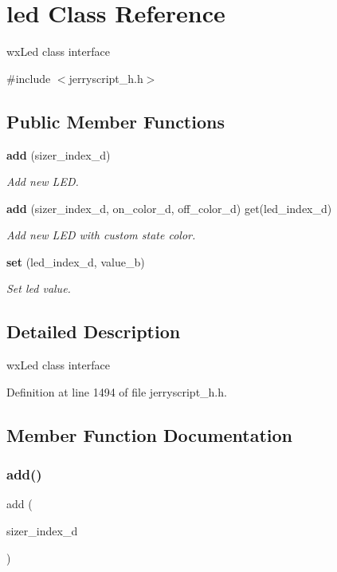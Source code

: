 \section{led Class Reference}
\label{classled}


wx\+Led class interface  




{\ttfamily \#include $<$jerryscript\+\_\+h.\+h$>$}

\subsection*{Public Member Functions}
\begin{DoxyCompactItemize}
\item 
\textbf{ add} (sizer\+\_\+index\+\_\+d)
\begin{DoxyCompactList}\small\item\em Add new L\+ED. \end{DoxyCompactList}\item 
\textbf{ add} (sizer\+\_\+index\+\_\+d, on\+\_\+color\+\_\+d, off\+\_\+color\+\_\+d) get(led\+\_\+index\+\_\+d)
\begin{DoxyCompactList}\small\item\em Add new L\+ED with custom state color. \end{DoxyCompactList}\item 
\textbf{ set} (led\+\_\+index\+\_\+d, value\+\_\+b)
\begin{DoxyCompactList}\small\item\em Set led value. \end{DoxyCompactList}\end{DoxyCompactItemize}


\subsection{Detailed Description}
wx\+Led class interface 

Definition at line 1494 of file jerryscript\+\_\+h.\+h.



\subsection{Member Function Documentation}
\mbox{\label{classled_ac4ae7d1ec7f719ab06c2b2b2b66bc979}} 
\subsubsection{add()\hspace{0.1cm}{\footnotesize\ttfamily [1/2]}}
{\footnotesize\ttfamily add (\begin{DoxyParamCaption}\item[{sizer\+\_\+index\+\_\+d}]{ }\end{DoxyParamCaption})}



